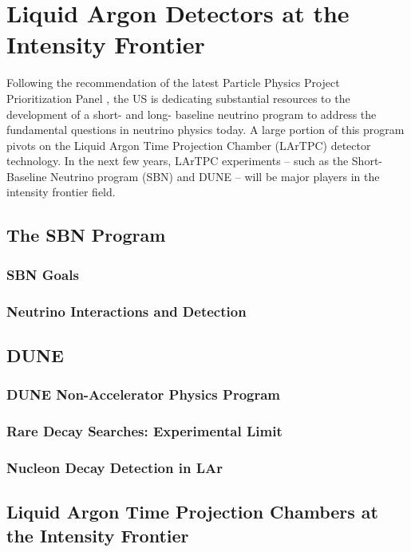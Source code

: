\chapter{Liquid Argon Detectors at the Intensity Frontier}
Following the recommendation of the latest Particle Physics Project Prioritization Panel  \cite{ParticlePhysicsProjectPrioritizationPanel(P5):2014pwa}, the US is dedicating substantial resources to the development of a short- and long- baseline neutrino program to address the fundamental questions in neutrino physics today. A large portion of this program pivots on the Liquid Argon Time Projection Chamber (LArTPC) detector technology. In the next few years, LArTPC experiments -- such as the Short-Baseline Neutrino program (SBN) and DUNE -- will be major players in the intensity frontier field. 

\section{The SBN Program}
\subsection{SBN Goals}
\subsection{Neutrino Interactions and Detection }

\section{DUNE}
\subsection{DUNE Non-Accelerator Physics Program}
\subsection{Rare Decay Searches: Experimental Limit}
\subsection{Nucleon Decay Detection in LAr}

\section{Liquid Argon Time Projection Chambers at the Intensity Frontier}

